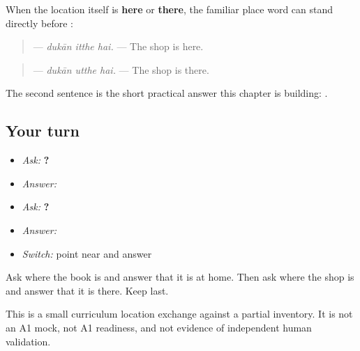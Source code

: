 \begin{grammarlens}[title={Grammar Lens: pointing without a postposition}]
When the location itself is \textbf{here} or \textbf{there}, the familiar place word can stand directly before \textbf{}:

\begin{quote}
\textbf{  } — \emph{dukān itthe hai.} — The shop is here.
\end{quote}

\begin{quote}
\textbf{  } — \emph{dukān utthe hai.} — The shop is there.
\end{quote}

The second sentence is the short practical answer this chapter is building: \textbf{  }.
\end{grammarlens}

\subsection*{Your turn}
\begin{itemize}
\raggedright
  \item \emph{Ask:} \textbf{  ?}
  \item \emph{Answer:} \textbf{   }
  \item \emph{Ask:} \textbf{  ?}
  \item \emph{Answer:} \textbf{  }
  \item \emph{Switch:} point near and answer \textbf{  }
\end{itemize}

\begin{tcolorbox}[breakable,colback=teal!4,colframe=teal!35!black,title={Before you move on}]
Ask where the book is and answer that it is at home. Then ask where the shop is and answer that it is there. Keep \textbf{} last.

This is a small curriculum location exchange against a partial inventory. It is not an A1 mock, not A1 readiness, and not evidence of independent human validation.
\end{tcolorbox}
